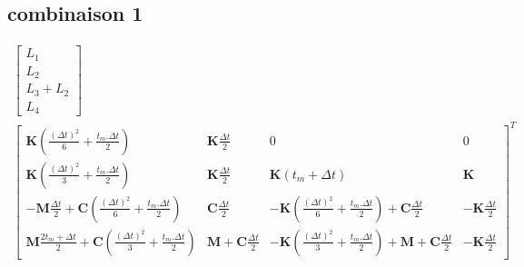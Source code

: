 \documentclass[12pt,a4paper]{report}
\begin{document}
\subsection{combinaison 1}
\begin{equation}
\!\!\!\!\!\!\!\!\!\!\!\!\!\!
\begin{array}{c}
	\begin{bmatrix}	
		  L_1
		\\L_2
		\\ L_3 + L_2
		\\L_4
	\end{bmatrix}
	\\
		\begin{bmatrix}	   
			   \mathbf{K}
				   \left( \frac{(\Delta t)^2}{6} + \frac{t_m.\Delta t}{2}
				   \right)
			&
		   		\mathbf{K} \frac{\Delta t}{2}
		   	&   
		   		0
			&
		   		0
		\\   
			   \mathbf{K}
				   \left( \frac{(\Delta t)^2}{3} + \frac{t_m.\Delta t}{2}
				   \right)
			&
		   		\mathbf{K} \frac{\Delta t}{2} 
		   	&
		   		\mathbf{K} (t_m + \Delta t)
			&
		   		\mathbf{K}
		\\   
			   -\mathbf{M}
			   		\frac{\Delta t}{2} 
			   +\mathbf{C}
			   		\left( \frac{(\Delta t)^2}{6} 
			   				+ \frac{t_m.\Delta t}{2} \right)  
		   	& 
		   		\mathbf{C} \frac{\Delta t}{2}
		   	&
			   	-\mathbf{K}
			   		(\frac{(\Delta t)^2}{6} + \frac{t_m.\Delta t}{2})
		   		+\mathbf{C} \frac{\Delta t}{2}
		   	&
		   		-\mathbf{K} \frac{\Delta t}{2}
		\\   
			   \mathbf{M}
			   		\frac{2t_m + \Delta t}{2} 
			   +\mathbf{C}
			   		\left( \frac{(\Delta t)^2}{3} 
			   				+ \frac{t_m.\Delta t}{2}\right)
		   	&
			   \mathbf{M} 
			   +\mathbf{C} \frac{\Delta t}{2}
		   	&
		   		-\mathbf{K} (\frac{(\Delta t)^2}{3} + \frac{t_m.\Delta t}{2})
		   		+\mathbf{M} 
			   	+\mathbf{C} \frac{\Delta t}{2}
		   	&
		   		-\mathbf{K} \frac{\Delta t}{2}
	\end{bmatrix}^T
\end{array}
\end{equation}
\end{document}
